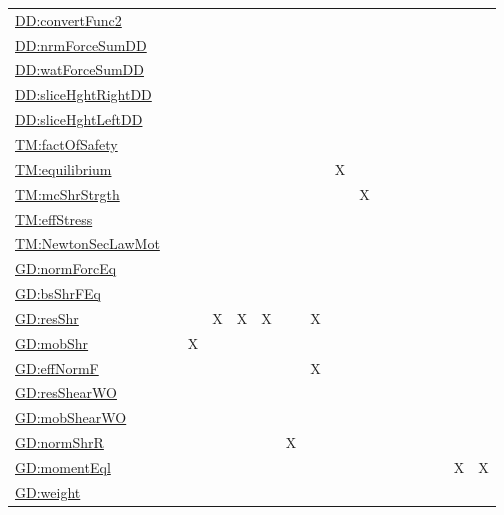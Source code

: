 \documentclass[12pt]{article}
\begin{document}
\begin{longtable}{l l l l l l l l l l l l l l l l l}
\\
\hyperref[DD:convertFunc2]{DD:convertFunc2} &  &  &  &  &  &  &  &  &  &  &  &  &  &  &  & 
\\
\hyperref[DD:nrmForceSumDD]{DD:nrmForceSumDD} &  &  &  &  &  &  &  &  &  &  &  &  &  &  &  & 
\\
\hyperref[DD:watForceSumDD]{DD:watForceSumDD} &  &  &  &  &  &  &  &  &  &  &  &  &  &  &  & 
\\
\hyperref[DD:sliceHghtRightDD]{DD:sliceHghtRightDD} &  &  &  &  &  &  &  &  &  &  &  &  &  &  &  & 
\\
\hyperref[DD:sliceHghtLeftDD]{DD:sliceHghtLeftDD} &  &  &  &  &  &  &  &  &  &  &  &  &  &  &  & 
\\
\hyperref[TM:factOfSafety]{TM:factOfSafety} &  &  &  &  &  &  &  &  &  &  &  &  &  &  &  & 
\\
\hyperref[TM:equilibrium]{TM:equilibrium} &  &  &  &  &  &  &  & X &  &  &  &  &  &  &  & 
\\
\hyperref[TM:mcShrStrgth]{TM:mcShrStrgth} &  &  &  &  &  &  &  &  & X &  &  &  &  &  &  & 
\\
\hyperref[TM:effStress]{TM:effStress} &  &  &  &  &  &  &  &  &  &  &  &  &  &  &  & 
\\
\hyperref[TM:NewtonSecLawMot]{TM:NewtonSecLawMot} &  &  &  &  &  &  &  &  &  &  &  &  &  &  &  & 
\\
\hyperref[GD:normForcEq]{GD:normForcEq} &  &  &  &  &  &  &  &  &  &  &  &  &  &  &  & 
\\
\hyperref[GD:bsShrFEq]{GD:bsShrFEq} &  &  &  &  &  &  &  &  &  &  &  &  &  &  &  & 
\\
\hyperref[GD:resShr]{GD:resShr} &  &  & X & X & X &  & X &  &  &  &  &  &  &  &  & 
\\
\hyperref[GD:mobShr]{GD:mobShr} &  & X &  &  &  &  &  &  &  &  &  &  &  &  &  & 
\\
\hyperref[GD:effNormF]{GD:effNormF} &  &  &  &  &  &  & X &  &  &  &  &  &  &  &  & 
\\
\hyperref[GD:resShearWO]{GD:resShearWO} &  &  &  &  &  &  &  &  &  &  &  &  &  &  &  & 
\\
\hyperref[GD:mobShearWO]{GD:mobShearWO} &  &  &  &  &  &  &  &  &  &  &  &  &  &  &  & 
\\
\hyperref[GD:normShrR]{GD:normShrR} &  &  &  &  &  & X &  &  &  &  &  &  &  &  &  & 
\\
\hyperref[GD:momentEql]{GD:momentEql} &  &  &  &  &  &  &  &  &  &  &  &  &  &  & X & X
\\
\hyperref[GD:weight]{GD:weight} &  &  &  &  &  &  &  &  &  &  &  &  &  &  &  & 

\end{longtable}
\end{document}
